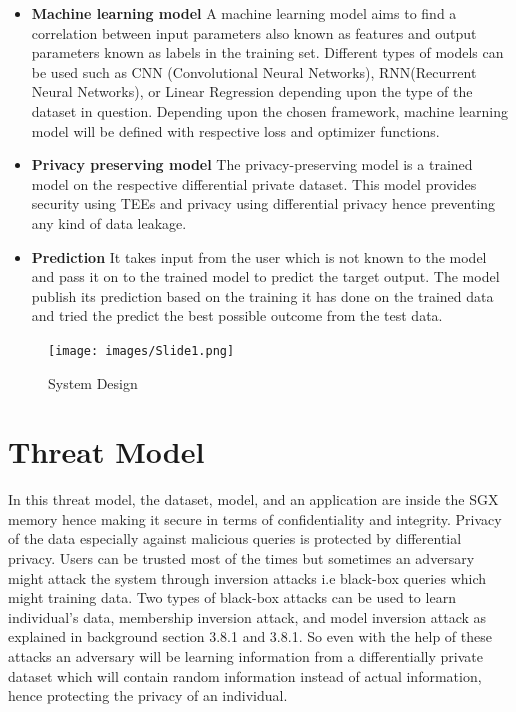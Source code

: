 \begin{itemize}
    \vspace{-0.3cm}\item \textbf{Machine learning model}
A machine learning model aims to find a correlation between input parameters also known as features and output parameters known as labels in the training set. Different types of models can be used such as CNN (Convolutional Neural Networks), RNN(Recurrent Neural Networks), or Linear Regression depending upon the type of the dataset in question. Depending upon the chosen framework, machine learning model will be defined with respective loss and optimizer functions. 
    \vspace{-0.3cm}\item \textbf{Privacy preserving model}
The privacy-preserving model is a trained model on the respective differential private dataset. This model provides security using TEEs and privacy using differential privacy hence preventing any kind of data leakage.
    \vspace{-0.3cm}\item \textbf{Prediction}
It takes input from the user which is not known to the model and pass it on to the trained model to predict the target output. The model publish its prediction based on the training it has done on the trained data and tried the predict the best possible outcome from the test data.
\end{itemize}
\begin{figure}
    \centering
    \texttt{[image: images/Slide1.png]}
    \caption{System Design}
    \label{default}
\end{figure}

\section{Threat Model}
In this threat model, the dataset, model, and an application are inside the SGX memory hence making it secure in terms of confidentiality and integrity. Privacy of the data especially against malicious queries is protected by differential privacy. Users can be trusted most of the times but sometimes an adversary might attack the system through inversion attacks i.e black-box queries which might training data. Two types of black-box attacks can be used to learn individual's data, membership inversion attack, and model inversion attack as explained in background section 3.8.1 and 3.8.1. So even with the help of these attacks an adversary will be learning information from a differentially private dataset which will contain random information instead of actual information, hence protecting the privacy of an individual.

